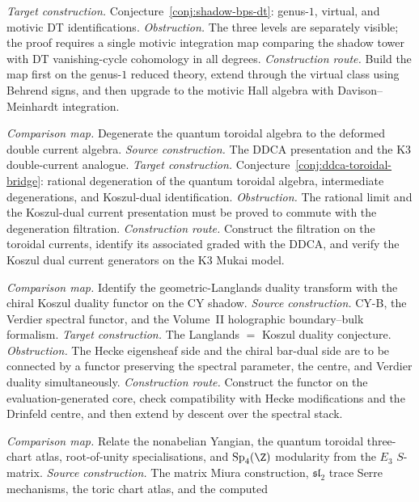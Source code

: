 \begin{description}[leftmargin=2.7em,style=nextline,topsep=0.3ex,itemsep=0.6ex]
 \emph{Target construction.}
 Conjecture~\ref{conj:shadow-bps-dt}: genus-$1$, virtual,
 and motivic DT identifications.
 \emph{Obstruction.}
 The three levels are separately visible; the proof requires
 a single motivic integration map comparing the shadow tower
 with DT vanishing-cycle cohomology in all degrees.
 \emph{Construction route.}
 Build the map first on the genus-$1$ reduced theory, extend
 through the virtual class using Behrend signs, and then
 upgrade to the motivic Hall algebra with Davison--Meinhardt
 integration.
 \item[\textbf{CM--DDCA. Deformed double-current to toroidal algebra.}]
 \emph{Comparison map.}
 Degenerate the quantum toroidal algebra to the deformed
 double current algebra.
 \emph{Source construction.}
 The DDCA presentation and the K3 double-current analogue.
 \emph{Target construction.}
 Conjecture~\ref{conj:ddca-toroidal-bridge}: rational
 degeneration of the quantum toroidal algebra, intermediate
 degenerations, and Koszul-dual identification.
 \emph{Obstruction.}
 The rational limit and the Koszul-dual current presentation
 must be proved to commute with the degeneration filtration.
 \emph{Construction route.}
 Construct the filtration on the toroidal currents, identify
 its associated graded with the DDCA, and verify the Koszul
 dual current generators on the K3 Mukai model.
 \item[\textbf{CM--LK. Langlands to Koszul duality.}]
 \emph{Comparison map.}
 Identify the geometric-Langlands duality transform with the
 chiral Koszul duality functor on the CY shadow.
 \emph{Source construction.}
 CY-B, the Verdier spectral functor, and the Volume~II
 holographic boundary--bulk formalism.
 \emph{Target construction.}
 The Langlands $=$ Koszul duality conjecture.
 \emph{Obstruction.}
 The Hecke eigensheaf side and the chiral bar-dual side are
 to be connected by a functor preserving the spectral
 parameter, the centre, and Verdier duality simultaneously.
 \emph{Construction route.}
 Construct the functor on the evaluation-generated core,
 check compatibility with Hecke modifications and the
 Drinfeld centre, and then extend by descent over the
 spectral stack.
\item[\textbf{CM--QG. Higher quantum-group comparison.}]
 \emph{Comparison map.}
 Relate the nonabelian Yangian, the quantum toroidal
 three-chart atlas, root-of-unity specialisations, and
 $\Sp_4(\Z)$ modularity from the $E_3$ $S$-matrix.
 \emph{Source construction.}
 The matrix Miura construction, $\mathfrak{sl}_2$ trace
 Serre mechanisms, the toric chart atlas, and the computed

\end{description}
